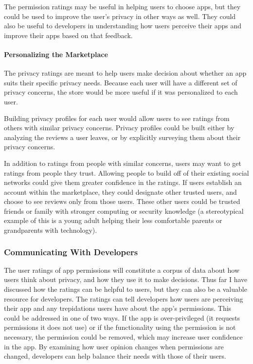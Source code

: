 \documentclass[11pt]{article}
\begin{document}
The permission ratings may be useful in helping users to choose apps, but
they could be used to improve the user's privacy in other ways as well. They could
also be useful to developers in understanding how users perceive their apps 
and improve their apps based on that feedback.

\paragraph{Personalizing the Marketplace}
\label{subsubsec-personalizing}

The privacy ratings are meant to help users make decision about whether
an app suits their specific privacy needs. Because each user will have a different
set of privacy concerns, the store would be more useful if it was personalized
to each user.

Building privacy profiles for each user would allow users to see ratings from
others with similar privacy concerns. Privacy profiles could be built either by 
analyzing the reviews a user leaves, or by explicitly surveying them about their
privacy concerns. 

In addition to ratings from people with similar concerns, users may want to get
ratings from people they trust. Allowing people to build off of their existing 
social networks could give them greater confidence in the ratings. If users 
establish an account within the marketplace, they could designate other trusted
users, and choose to see reviews only from those users.
These other users could be trusted friends or family with stronger
computing or security knowledge (a stereotypical example of this is a
young adult helping their less comfortable parents or grandparents with technology).


\subsubsection{Communicating With Developers}
\label{subsubsec-dev-comm}

The user ratings of app permissions will constitute a corpus of 
data about how users think about privacy, and how they use it to make decisions.
Thus far I have discussed how the ratings can be helpful to users, but
they can also be a valuable resource for developers. The ratings can tell
developers how users are perceiving their app and any trepidations users
have about the app's permissions. This could be addressed in one of two 
ways. If the app is over-privileged (it requests permissions it does not
use) or if the functionality using the permission is not necessary, the
permission could be removed, which may increase user confidence in the 
app. By examining how user opinion changes when permissions are changed,
developers can help balance their needs with those of their users. 
\end{document}
